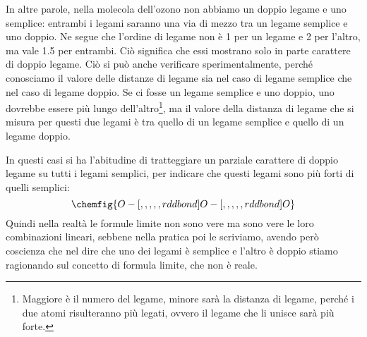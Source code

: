    In altre parole, nella molecola dell'ozono non abbiamo un doppio legame e uno semplice: entrambi i legami saranno una via di mezzo tra un legame semplice e uno doppio. Ne segue che l'ordine di legame non è 1 per un legame e 2 per l'altro, ma vale 1.5  per entrambi. Ciò significa che essi mostrano solo in parte carattere di doppio legame.
    Ciò si può anche verificare sperimentalmente, perché conosciamo il valore delle distanze di legame sia nel caso di legame semplice che nel caso di legame doppio. Se ci fosse un legame semplice e uno doppio, uno dovrebbe essere più lungo dell'altro\footnote{Maggiore è il numero del legame, minore sarà la distanza di legame, perché i due atomi risulteranno più legati, ovvero il legame che li unisce sarà più forte.}, ma il valore della distanza di legame che si misura per questi due legami è tra quello di un legame semplice e quello di un legame doppio.

    In questi casi si ha l'abitudine di tratteggiare un parziale carattere di doppio legame su tutti i legami semplici, per indicare che questi legami sono più forti di quelli semplici:
    $$
    \chemfig{O-[,,,,,rddbond]O-[,,,,,rddbond]O}
    $$
    Quindi nella realtà le formule limite non sono vere ma sono vere le loro combinazioni lineari, sebbene nella pratica poi le scriviamo, avendo però coscienza che nel dire che uno dei legami è semplice e l'altro è doppio stiamo ragionando sul concetto di formula limite, che non è reale.

